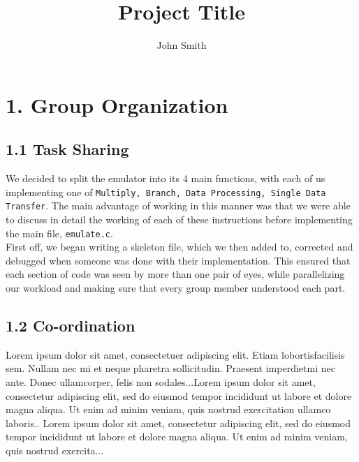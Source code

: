 \documentclass[a4paper, twoside]{report}
\title{Project Title}
\author{John Smith}
\begin{document}



\section*{1. Group Organization}

\subsection*{1.1 Task Sharing}
We decided to split the emulator into its 4 main functions, with each of us implementing one of \verb|Multiply, Branch, Data Processing, Single Data Transfer|. The main advantage of working in this manner was that we were able to discuss in detail the working of each of these instructions before implementing the main file, \verb|emulate.c|. \\
First off, we began writing a skeleton file, which we then added to, corrected and debugged when someone was done with their implementation. This ensured that each section of code was seen by more than one pair of eyes, while parallelizing our workload and making sure that every group member understood each part. 


\subsection*{1.2 Co-ordination}
Lorem  ipsum  dolor  sit  amet,  consectetuer  adipiscing  
elit.   Etiam  lobortisfacilisis sem.  Nullam nec mi et 
neque pharetra sollicitudin.  Praesent imperdietmi nec ante. 
Donec ullamcorper, felis non sodales...Lorem ipsum dolor sit amet, consectetur adipiscing elit, sed do 
eiusmod tempor incididunt ut labore et dolore magna aliqua. Ut 
enim ad minim veniam, quis nostrud exercitation ullamco laboris..
 Lorem ipsum dolor sit amet, consectetur adipiscing elit, sed do 
eiusmod tempor incididunt ut labore et dolore magna aliqua. Ut 
enim ad minim veniam, quis nostrud exercita...

\section*{}
\end{document}
